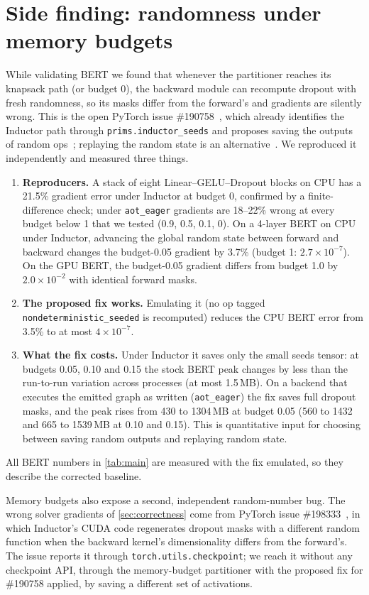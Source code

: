 \documentclass[10pt]{article}
\newcommand{\code}[1]{\texttt{#1}}
\begin{document}
\section{Side finding: randomness under memory budgets}
\label{sec:rng}
While validating BERT we found that whenever the partitioner reaches its knapsack path (or budget 0), the backward module
can recompute dropout with fresh randomness,
so its masks differ from the forward's and gradients are silently wrong. This is the open PyTorch issue
\#190758~\citep{issue190758}, which already identifies the Inductor path through \code{prims.inductor\_seeds} and
proposes saving the outputs of random ops~\citep{pr190759}; replaying the random state is an
alternative~\citep{pr191684}. We reproduced it independently and measured three things.
\begin{enumerate}
\item \textbf{Reproducers.} A stack of eight Linear--GELU--Dropout blocks on CPU has a 21.5\% gradient error under
Inductor at budget 0, confirmed by a finite-difference check; under \code{aot\_eager} gradients are 18--22\% wrong at
every budget below 1 that we tested (0.9, 0.5, 0.1, 0). On a 4-layer BERT on CPU under Inductor, advancing the global
random state between forward and backward changes the budget-0.05 gradient by 3.7\% (budget 1: $2.7\times10^{-7}$).
On the GPU BERT, the budget-0.05 gradient differs from budget 1.0 by $2.0\times10^{-2}$ with identical forward masks.
\item \textbf{The proposed fix works.} Emulating it (no op tagged \code{nondeterministic\_seeded} is recomputed) reduces
the CPU BERT error from 3.5\% to at most $4\times10^{-7}$.
\item \textbf{What the fix costs.} Under Inductor it saves only the small seeds tensor: at budgets 0.05, 0.10 and 0.15 the stock
BERT peak changes by less than the run-to-run variation across processes (at most 1.5\,MB). On a backend that executes the
emitted graph as written (\code{aot\_eager}) the fix saves full dropout masks, and the peak rises from 430 to 1304\,MB
at budget 0.05 (560 to 1432 and 665 to 1539\,MB at 0.10 and 0.15). This is quantitative input for choosing between
saving random outputs and replaying random state.
\end{enumerate}
All BERT numbers in \cref{tab:main} are measured with the fix emulated, so they describe the corrected baseline.

Memory budgets also expose a second, independent random-number bug. The wrong solver gradients of
\cref{sec:correctness} come from PyTorch issue \#198333~\citep{issue198333}, in which Inductor's CUDA code regenerates
dropout masks with a different random function when the backward kernel's dimensionality differs from the forward's.
The issue reports it through \code{torch.utils.checkpoint}; we reach it without any checkpoint API, through the
memory-budget partitioner with the proposed fix for \#190758 applied, by saving a different set of activations.
\end{document}
